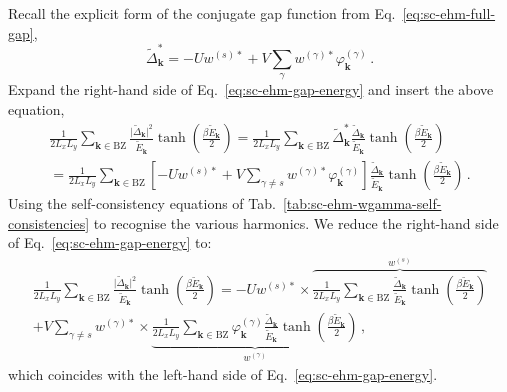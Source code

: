 \begin{tabproof}
	
	Recall the explicit form of the conjugate gap function from Eq.~\eqref{eq:sc-ehm-full-gap},
	\[
	\tilde{\Delta}_\mathbf{k}^* = -Uw^{(s)*} + V \sum_{\gamma} w^{(\gamma)*} \varphi_\mathbf{k}^{(\gamma)} \, .
	\]
	Expand the right-hand side of Eq.~\eqref{eq:sc-ehm-gap-energy} and insert the above equation,
	\begin{multline*}
		\frac{1}{2L_x L_y} \sum_{\mathbf{k} \in \mathrm{BZ}} \frac{\big|
			\tilde{\Delta}_\mathbf{k}
			\big|^2}{\tilde{E}_\mathbf{k}} \tanh(\frac{\beta\tilde{E}_\mathbf{k}}{2})
		= \frac{1}{2L_x L_y} \sum_{\mathbf{k} \in \mathrm{BZ}} \tilde{\Delta}_\mathbf{k}^*
		\frac{
			\tilde{\Delta}_\mathbf{k}
		}{\tilde{E}_\mathbf{k}} \tanh(\frac{\beta\tilde{E}_\mathbf{k}}{2}) \\
		= \frac{1}{2L_x L_y} \sum_{\mathbf{k} \in \mathrm{BZ}} \left[
		-Uw^{(s)*} + V \sum_{\gamma\neq s} w^{(\gamma)*} \varphi_\mathbf{k}^{(\gamma)} 
		\right]
		\frac{
			\tilde{\Delta}_\mathbf{k}
		}{\tilde{E}_\mathbf{k}} \tanh(\frac{\beta\tilde{E}_\mathbf{k}}{2}) \, .
	\end{multline*}
	Using the self-consistency equations of Tab.~\ref{tab:sc-ehm-wgamma-self-consistencies} to recognise the various harmonics. We reduce the right-hand side of Eq.~\eqref{eq:sc-ehm-gap-energy} to:
	\begin{multline*}
		\frac{1}{2L_x L_y} \sum_{\mathbf{k} \in \mathrm{BZ}} \frac{\big|
			\tilde{\Delta}_\mathbf{k}
			\big|^2}{\tilde{E}_\mathbf{k}} \tanh(\frac{\beta\tilde{E}_\mathbf{k}}{2})= -Uw^{(s)*} \times \overbrace{
			\frac{1}{2L_x L_y} \sum_{\mathbf{k} \in \mathrm{BZ}} \frac{
				\tilde{\Delta}_\mathbf{k}
			}{\tilde{E}_\mathbf{k}} \tanh(\frac{\beta\tilde{E}_\mathbf{k}}{2})
		}^{w^{(s)}} \\
		+ V \sum_{\gamma\neq s} w^{(\gamma)*} \times \underbrace{
			\frac{1}{2L_x L_y} \sum_{\mathbf{k} \in \mathrm{BZ}} \varphi_\mathbf{k}^{(\gamma)} \frac{
				\tilde{\Delta}_\mathbf{k}
			}{\tilde{E}_\mathbf{k}} 	\tanh(\frac{\beta\tilde{E}_\mathbf{k}}{2})
		}_{w^{(\gamma)}} \, ,
	\end{multline*}
	which coincides with the left-hand side of Eq.~\eqref{eq:sc-ehm-gap-energy}.
\end{tabproof}